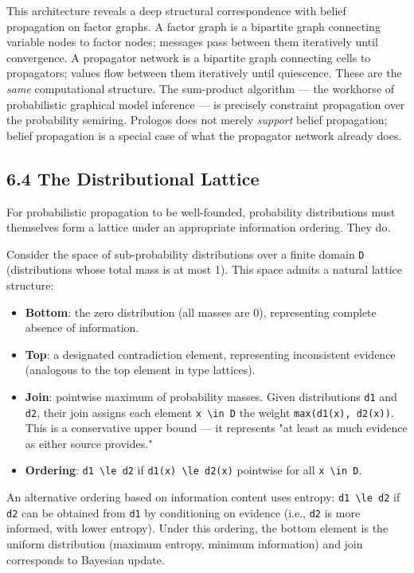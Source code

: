 \documentclass[11pt]{article}
\begin{document}
This architecture reveals a deep structural correspondence with belief propagation on factor graphs. A factor graph is a bipartite graph connecting variable nodes to factor nodes; messages pass between them iteratively until convergence. A propagator network is a bipartite graph connecting cells to propagators; values flow between them iteratively until quiescence. These are the \emph{same} computational structure. The sum-product algorithm --- the workhorse of probabilistic graphical model inference --- is precisely constraint propagation over the probability semiring. Prologos does not merely \emph{support} belief propagation; belief propagation is a special case of what the propagator network already does.
\subsection{6.4 The Distributional Lattice}
\label{sec:orgeaa9ac3}

For probabilistic propagation to be well-founded, probability distributions must themselves form a lattice under an appropriate information ordering. They do.

Consider the space of sub-probability distributions over a finite domain \texttt{D} (distributions whose total mass is at most 1). This space admits a natural lattice structure:

\begin{itemize}
\item \textbf{Bottom}: the zero distribution (all masses are 0), representing complete absence of information.
\item \textbf{Top}: a designated contradiction element, representing inconsistent evidence (analogous to the top element in type lattices).
\item \textbf{Join}: pointwise maximum of probability masses. Given distributions \texttt{d1} and \texttt{d2}, their join assigns each element \texttt{x \textbackslash{}in D} the weight \texttt{max(d1(x), d2(x))}. This is a conservative upper bound --- it represents "at least as much evidence as either source provides."
\item \textbf{Ordering}: \texttt{d1 \textbackslash{}le d2} if \texttt{d1(x) \textbackslash{}le d2(x)} pointwise for all \texttt{x \textbackslash{}in D}.
\end{itemize}

An alternative ordering based on information content uses entropy: \texttt{d1 \textbackslash{}le d2} if \texttt{d2} can be obtained from \texttt{d1} by conditioning on evidence (i.e., \texttt{d2} is more informed, with lower entropy). Under this ordering, the bottom element is the uniform distribution (maximum entropy, minimum information) and join corresponds to Bayesian update.
\end{document}
